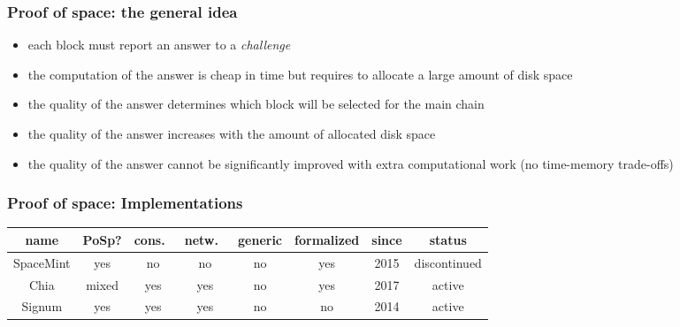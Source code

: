 \documentclass[11pt]{beamer}  %
\begin{document}
\begin{frame}\frametitle{Proof of space: the general idea}

  \begin{itemize}
  \item each block must report an answer to a \emph{challenge}
  \item the computation of the answer is cheap in time but requires to allocate a large amount of disk space
  \item the quality of the answer determines which block will be selected for the main chain
  \item the quality of the answer increases with the amount of allocated disk space
  \item the quality of the answer cannot be significantly improved with extra computational work (no time-memory trade-offs)
  \end{itemize}
  
\end{frame}

\begin{frame}\frametitle{Proof of space: Implementations}

  \begin{center}
    {\small\begin{tabular}{c|c|c|c|c|c|c|c}
      name & PoSp? & cons.\ & netw.\ & generic & formalized & since & status \\\hline\hline
      SpaceMint & yes & no & no & no & yes & 2015 & discontinued\\\hline
      Chia & mixed & yes & yes & no & yes & 2017 & active\\\hline
      Signum & yes & yes & yes & no & no & 2014 & active\\\hline
    \end{tabular}}
  \end{center}
  
\end{frame}
\end{document}
